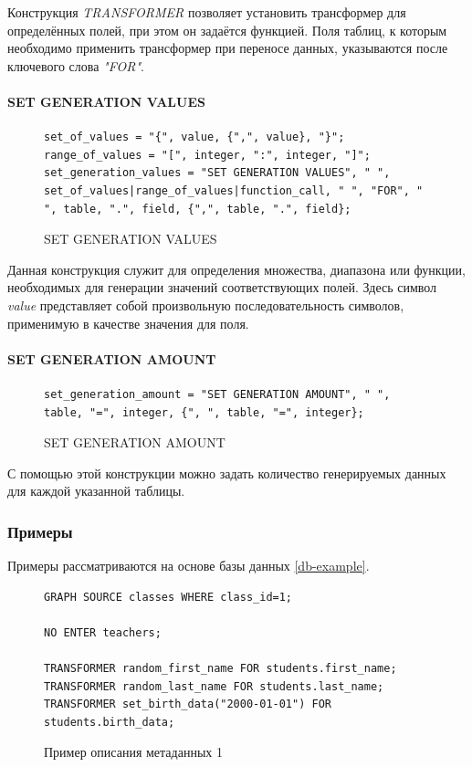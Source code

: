 Конструкция \textit{TRANSFORMER} позволяет установить трансформер для определённых полей, при этом он задаётся функцией. Поля таблиц, к которым необходимо применить трансформер при переносе данных, указываются после ключевого слова \textit{"FOR"}.

\paragraph{SET GENERATION VALUES}

\begin{figure}
  \begin{lstlisting}
set_of_values = "{", value, {",", value}, "}";
range_of_values = "[", integer, ":", integer, "]";
set_generation_values = "SET GENERATION VALUES", " ", set_of_values|range_of_values|function_call, " ", "FOR", " ", table, ".", field, {",", table, ".", field};
  \end{lstlisting}
  \caption{SET GENERATION VALUES}
  \label{symbol-set-generation-values}
\end{figure}

Данная конструкция служит для определения множества, диапазона или функции, необходимых для генерации значений соответствующих полей. Здесь символ \textit{value} представляет собой произвольную последовательность символов, применимую в качестве значения для поля.

\paragraph{SET GENERATION AMOUNT}

\begin{figure}
  \begin{lstlisting}
set_generation_amount = "SET GENERATION AMOUNT", " ", table, "=", integer, {", ", table, "=", integer};
  \end{lstlisting}
  \caption{SET GENERATION AMOUNT}
  \label{symbol-set-generation-amount}
\end{figure}

С помощью этой конструкции можно задать количество генерируемых данных для каждой указанной таблицы.

\subsubsection{Примеры}

Примеры рассматриваются на основе базы данных \ref{db-example}.

\begin{figure}
  \begin{lstlisting}
GRAPH SOURCE classes WHERE class_id=1;

NO ENTER teachers;

TRANSFORMER random_first_name FOR students.first_name;
TRANSFORMER random_last_name FOR students.last_name;
TRANSFORMER set_birth_data("2000-01-01") FOR students.birth_data;
  \end{lstlisting}
  \caption{Пример описания метаданных 1}
  \label{metadata-example-1}
\end{figure}

